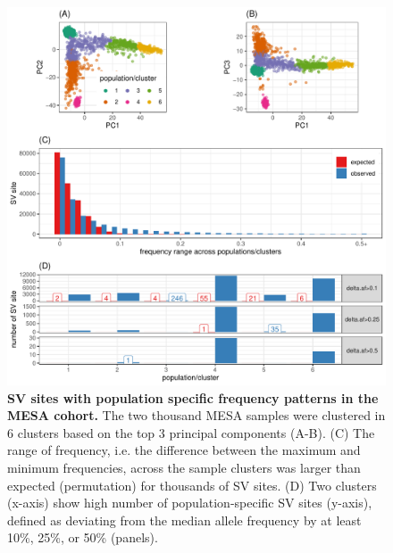 \documentclass[11pt]{ucscthesis}
\begin{document}
\begin{figure}[p]
  \includegraphics[width=\linewidth]{fig-pops-freq-mesa.pdf}
  \caption[SV sites with population specific frequency patterns in the MESA cohort]{{\bf SV sites with population specific frequency patterns in the MESA cohort.}
    The two thousand MESA samples were clustered in 6 clusters based on the top 3 principal components (A-B).
    (C) The range of frequency, i.e. the difference between the maximum and minimum frequencies, across the sample clusters was larger than expected (permutation) for thousands of SV sites.
    (D) Two clusters (x-axis) show high number of population-specific SV sites (y-axis), defined as deviating from the median allele frequency by at least 10\%, 25\%, or 50\% (panels).}
  \label{fig:mesa-pop-freq}
\end{figure}
\end{document}
